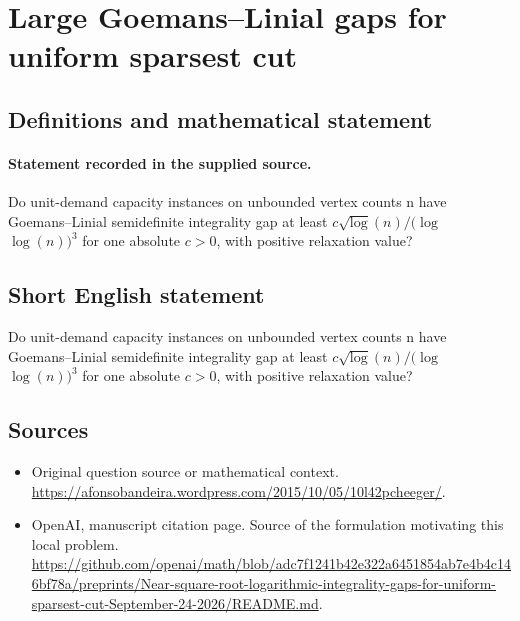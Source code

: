\documentclass[11pt]{article}
\begin{document}
\section*{Large Goemans–Linial gaps for uniform sparsest cut}\label{30007493}
\subsection{Definitions and mathematical statement}
\paragraph{Statement recorded in the supplied source.}
Do unit-demand capacity instances on unbounded vertex counts n have Goemans–Linial semidefinite integrality gap at least $c\surd \log (n)/(\log $ $\log (n))^{3}$ for one absolute $c>0$, with positive relaxation value?
\subsection{Short English statement}
Do unit-demand capacity instances on unbounded vertex counts n have Goemans–Linial semidefinite integrality gap at least $c\surd \log (n)/(\log $ $\log (n))^{3}$ for one absolute $c>0$, with positive relaxation value?
\subsection{Sources}
\begin{itemize}
\item[S1] Original question source or mathematical context.
\url{https://afonsobandeira.wordpress.com/2015/10/05/10l42pcheeger/}.
\item[S2] OpenAI, manuscript citation page. Source of the formulation motivating this local problem.
\url{https://github.com/openai/math/blob/adc7f1241b42e322a6451854ab7e4b4c146bf78a/preprints/Near-square-root-logarithmic-integrality-gaps-for-uniform-sparsest-cut-September-24-2026/README.md}.
\end{itemize}
\end{document}
